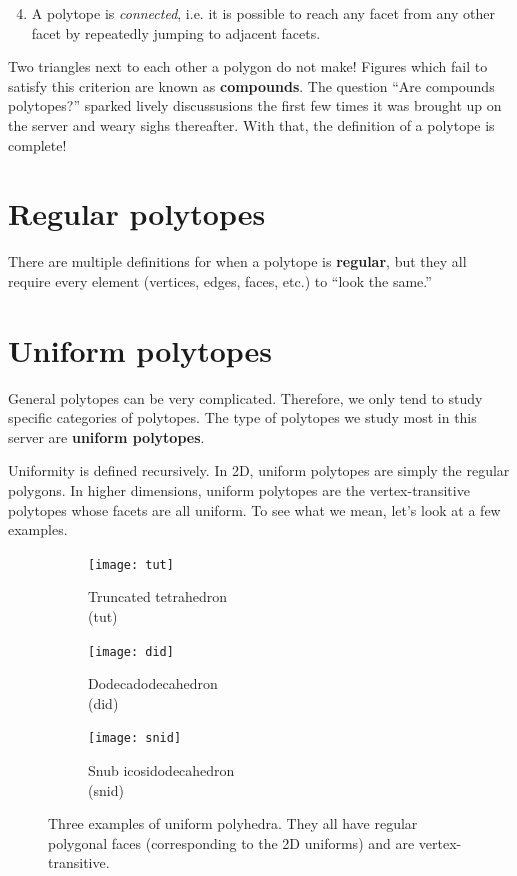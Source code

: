 \documentclass{article}
\begin{document}
\begin{enumerate}
  \setcounter{enumi}{3}
\item
  A polytope is \textit{connected}, i.e.
  it is possible to reach any facet from any other facet
  by repeatedly jumping to adjacent facets.
\end{enumerate}

Two triangles next to each other a polygon do not make!
Figures which fail to satisfy this criterion are known as \textbf{compounds}.
The question ``Are compounds polytopes?'' sparked lively discussusions
the first few times it was brought up on the server
and weary sighs thereafter.
With that, the definition of a polytope is complete!

\section{Regular polytopes}
There are multiple definitions for when a polytope is \textbf{regular},
but they all require every element (vertices, edges, faces, etc.) to ``look the same.''

\section{Uniform polytopes}
General polytopes can be very complicated. Therefore, we only tend to study specific categories of polytopes. The type of polytopes we study most in this server are \textbf{uniform polytopes}.

Uniformity is defined recursively. In 2D, uniform polytopes are simply the regular polygons.
In higher dimensions, uniform polytopes are the vertex-transitive polytopes whose facets are all uniform. To see what we mean, let's look at a few examples.

\begin{figure}[H]
\centering
\begin{subfigure}{.33333\textwidth}
  \centering
  \texttt{[image: tut]}
  \caption{Truncated tetrahedron\\(tut)}
  \label{fig:tut}
\end{subfigure}%
\begin{subfigure}{.33333\textwidth}
  \centering
  \texttt{[image: did]}
  \caption{Dodecadodecahedron\\(did)}
  \label{fig:did}
\end{subfigure}%
\begin{subfigure}{.33333\textwidth}
  \centering
  \texttt{[image: snid]}
  \caption{Snub icosidodecahedron\\(snid)}
  \label{fig:snid}
\end{subfigure}%
\caption{Three examples of uniform polyhedra. They all have regular polygonal faces (corresponding to the 2D uniforms) and are vertex-transitive.}
\label{fig:uniforms3D}
\end{figure}
\end{document}
